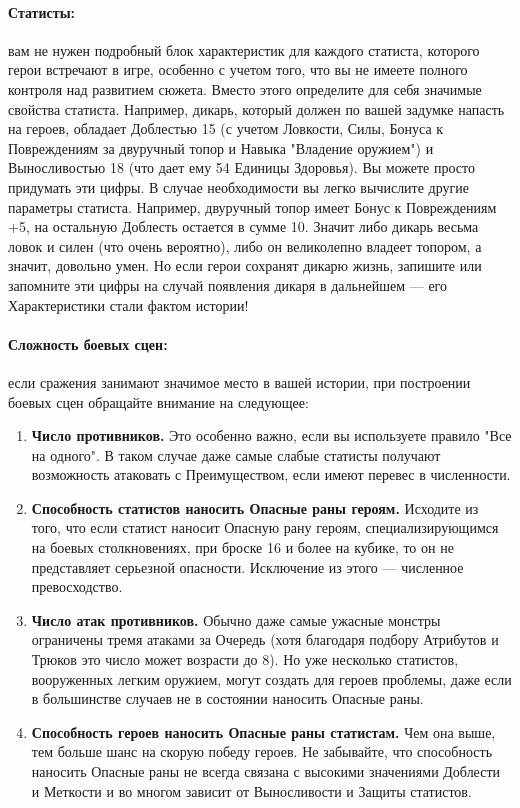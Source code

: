 \paragraph{Статисты:} вам не нужен подробный блок характеристик для каждого статиста, которого герои встречают в игре, особенно с учетом того, что вы не имеете полного контроля над развитием сюжета. Вместо этого определите для себя значимые свойства статиста. Например, дикарь, который должен по вашей задумке напасть на героев, обладает Доблестью 15 (с учетом Ловкости, Силы, Бонуса к Повреждениям за двуручный топор и Навыка "Владение оружием") и Выносливостью 18 (что дает ему 54 Единицы Здоровья). Вы можете просто придумать эти цифры. В случае необходимости вы легко вычислите другие параметры статиста. Например, двуручный топор имеет Бонус к Повреждениям +5, на остальную Доблесть остается в сумме 10. Значит либо дикарь весьма ловок и силен (что очень вероятно), либо он великолепно владеет топором, а значит, довольно умен. Но если герои сохранят дикарю жизнь, запишите или запомните эти цифры на случай появления дикаря в дальнейшем — его Характеристики стали фактом истории!
\paragraph{Сложность боевых сцен:} если сражения занимают значимое место в вашей истории, при построении боевых сцен обращайте внимание на следующее:
\begin{enumerate}
\item \textbf{Число противников.} Это особенно важно, если вы используете правило "Все на одного". В таком случае даже самые слабые статисты получают возможность атаковать с Преимуществом, если имеют перевес в численности.
\item \textbf{Способность статистов наносить Опасные раны героям.} Исходите из того, что если статист наносит Опасную рану героям, специализирующимся на боевых столкновениях, при броске 16 и более на кубике, то он не представляет серьезной опасности.
Исключение из этого — численное превосходство.
\item \textbf{Число атак противников.} Обычно даже самые ужасные монстры ограничены тремя атаками за Очередь (хотя благодаря подбору Атрибутов и Трюков это число может возрасти до 8). Но уже несколько статистов, вооруженных легким оружием, могут создать для героев проблемы, даже если в большинстве случаев не в состоянии наносить Опасные раны.
\item \textbf{Способность героев наносить Опасные раны статистам.} Чем она выше, тем больше шанс на скорую победу героев. Не забывайте, что способность наносить Опасные раны не всегда связана с высокими значениями Доблести и Меткости и во многом зависит от Выносливости и Защиты статистов.
\end{enumerate}